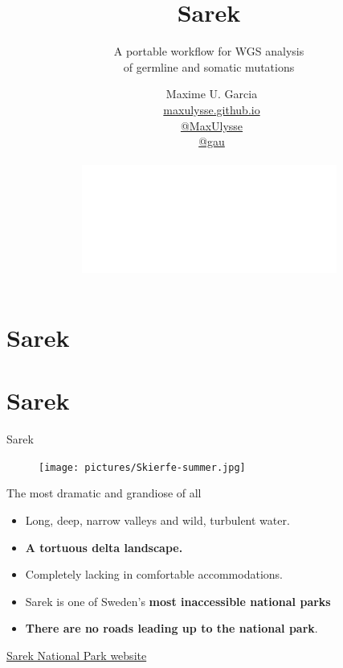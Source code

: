 \documentclass[usepdftitle=false]{beamer}
\title{%
	\vspace{-.8cm}%
	Sarek
}
\subtitle{%
	\normalsize{A portable workflow for WGS analysis\\of germline and somatic mutations}%
	\vspace{-.4cm}%
}
\author{
	\vspace{-.6cm}
	\faUser\ Maxime U. Garcia\\
	\faGlobe\ \href{https://maxulysse.github.io/}{maxulysse.github.io}\\
	\faGithub\ \href{https://github.com/MaxUlysse/}{@MaxUlysse}\\
	\faTwitter\ \href{https://twitter.com/gau/}{@gau}\\
	\\
	\includegraphics[height=.7cm]{pictures/DNAclub}
}
\date{\vfill}
\begin{document}
\section{Sarek}

{
	\maketitle
}

\section{Sarek}

\begin{frame}{Sarek}
	\begin{figure}
		\texttt{[image: pictures/Skierfe-summer.jpg]}
	\end{figure}
\end{frame}

\begin{frame}{The most dramatic and grandiose of all}
	\begin{itemize}
		\item Long, deep, narrow valleys and wild, turbulent water.
		\item \textbf{A tortuous delta landscape.}
		\item Completely lacking in comfortable accommodations.
		\item Sarek is one of Sweden’s \textbf{most inaccessible national parks}
		\item \textbf{There are no roads leading up to the national park}.
	\end{itemize}
	\hfill\href{http://www.nationalparksofsweden.se/choose-park---list/sarek-national-park/national-park-fact/}{Sarek National Park website}
\end{frame}
\end{document}
